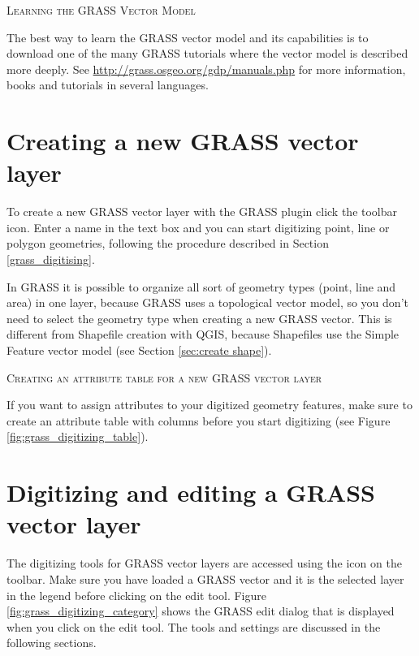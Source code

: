 \begin{Tip}\caption{\textsc{Learning the GRASS Vector Model}}
The best way to learn the GRASS vector model and its capabilities is to 
download one of the many GRASS tutorials where the vector model is described
more deeply. See \url{http://grass.osgeo.org/gdp/manuals.php} for more
information, books and tutorials in several languages.
\end{Tip} 

\section{Creating a new GRASS vector layer}\label{sec:creating_new_grass_vectors}

To create a new GRASS vector layer with the GRASS plugin click the 
 toolbar icon. 
Enter a name in the text box and you can start digitizing point, line or 
polygon geometries, following the procedure described in Section 
\ref{grass_digitising}. 

In GRASS it is possible to organize all sort of geometry types (point, line 
and area) in one layer, because GRASS uses a topological vector model, so you 
don't need to select the geometry type when creating a new GRASS vector. This 
is different from Shapefile creation with QGIS, because Shapefiles use the 
Simple Feature vector model (see Section \ref{sec:create shape}).

\begin{Tip}\caption{\textsc{Creating an attribute table for a new GRASS vector layer}}
If you want to assign attributes to your digitized geometry features, make sure to create an attribute table with columns before you start digitizing (see Figure \ref{fig:grass_digitizing_table}).
\end{Tip} 

\section{Digitizing and editing a GRASS vector layer}\label{grass_digitising}

The digitizing tools for GRASS vector layers are accessed using the
 icon on the toolbar. Make 
sure you have loaded a GRASS vector and it is the selected layer in the legend 
before clicking on the edit tool. Figure \ref{fig:grass_digitizing_category} 
shows the GRASS edit dialog that is displayed when you click on the edit tool. 
The tools and settings are discussed in the following sections.

